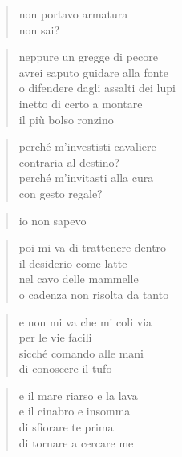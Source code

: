 	\begin{verse}
		non portavo armatura\\
		non sai?
	\end{verse}

	\begin{verse}
		neppure un gregge di pecore\\
		avrei saputo guidare alla fonte\\
		o difendere dagli assalti dei lupi\\
		inetto di certo a montare\\
		il più bolso ronzino
	\end{verse}

	\begin{verse}
		perché m'investisti cavaliere\\
		contraria al destino?\\
		perché m'invitasti alla cura\\
		con gesto regale?
	\end{verse}

	\begin{verse}
		io non sapevo
	\end{verse}

\clearpage


\vspace*{2cm}

	\begin{verse}
		poi mi va di trattenere dentro\\
		il desiderio come latte\\
		nel cavo delle mammelle\\
		o cadenza non risolta da tanto
	\end{verse}

	\begin{verse}
		e non mi va che mi coli via\\
		per le vie facili\\
		sicché comando alle mani\\
		di conoscere il tufo
	\end{verse}

	\begin{verse}
		e il mare riarso e la lava\\
		e il cinabro e insomma\\
		di sfiorare te prima\\
		di tornare a cercare me
	\end{verse}

\clearpage

